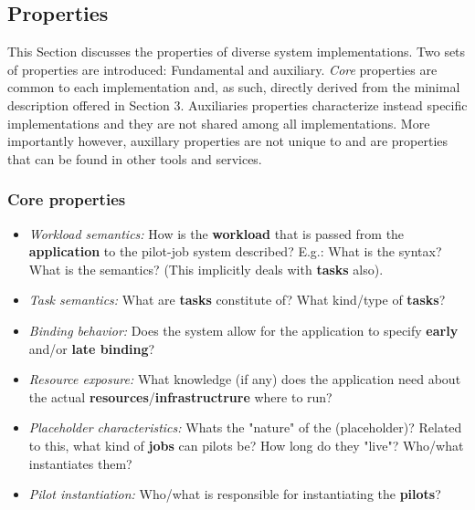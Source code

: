 \documentclass{sig-alternate}
\begin{document}


\subsection{Properties}

This Section discusses the properties of diverse \pilotjob system
implementations. Two sets of properties are introduced: Fundamental
and auxiliary. \textit{Core} properties are common to each
\pilotjob implementation and, as such, directly derived from the
minimal description offered in Section 3. Auxiliaries properties
characterize instead specific \pilotjob implementations and they are
not shared among all implementations.  More importantly however,
auxillary properties are not unique to \pilotjob and are properties
that can be found in other tools and services.


\subsubsection{Core properties}
\begin{itemize}

\item \textit{Workload semantics:} How is the \textbf{workload} that is passed
from the \textbf{application} to the pilot-job system described? E.g.: What is
the syntax? What is the semantics? (This implicitly deals with \textbf{tasks}
also).

\item \textit{Task semantics:} What are \textbf{tasks} constitute of? What
kind/type of \textbf{tasks}?

\item \textit{Binding behavior:} Does the \pilotjob system allow for the
application to specify \textbf{early} and/or \textbf{late binding}?

\item \textit{Resource exposure:} What knowledge (if any) does the application
need about the actual \textbf{resources}/\textbf{infrastructrure} where to run?

\item \textit{Placeholder characteristics:} Whats the "nature" of the
\textbf{\pilot} (placeholder)? Related to this, what kind of \textbf{jobs} can
pilots be? How long do they "live"? Who/what instantiates them?

\item \textit{Pilot instantiation:} Who/what is responsible for instantiating
the \textbf{pilots}?

\end{itemize}
\end{document}
